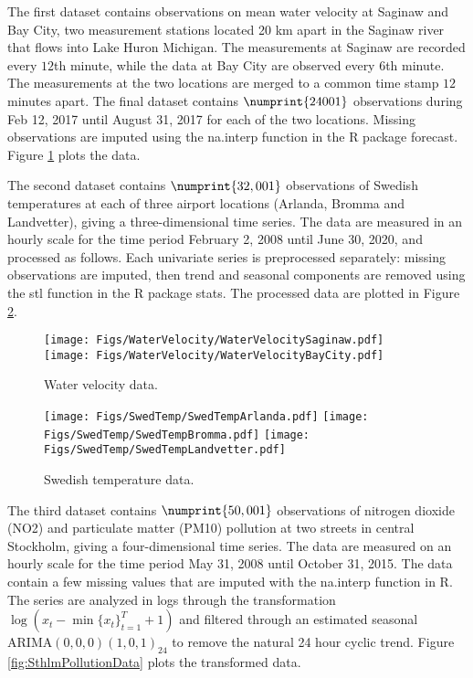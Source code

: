 \documentclass[11pt,english,oneside]{amsart}
\numberwithin{equation}{section}
\theoremstyle{plain}
\numberwithin{equation}{section}
\begin{document}
The first dataset contains observations on mean water velocity at Saginaw and Bay City, two measurement stations located 20 km apart in the Saginaw river that flows into Lake Huron Michigan. The measurements at Saginaw are recorded every $12$th minute, while the data at Bay City are observed every $6$th minute. The measurements at the two locations are merged to a common time stamp $12$ minutes apart. The final dataset contains $\numprint{24001}$ observations during Feb 12, 2017 until August 31, 2017 for each of the two locations. Missing observations are imputed using the {\sf na.interp} function in the R package {\sf forecast}. Figure \ref{fig:WaterVelocityData} plots the data.

The second dataset contains $\numprint{32,001}$ observations of Swedish temperatures at each of three airport locations (Arlanda, Bromma and Landvetter), giving a three-dimensional time series. The data are measured in an hourly scale for the time period February 2, 2008 until June 30, 2020, and processed as follows. Each univariate series is preprocessed separately: missing observations are imputed, then trend and seasonal components are removed using the {\sf stl} function in the R package {\sf stats}. The processed data are plotted in Figure \ref{fig:SwedTempData}.


\begin{figure}\label{fig:WaterVelocityData}
    \texttt{[image: Figs/WaterVelocity/WaterVelocitySaginaw.pdf]}
    \texttt{[image: Figs/WaterVelocity/WaterVelocityBayCity.pdf]}
    \caption{Water velocity data.}
\end{figure}

\begin{figure}
    \texttt{[image: Figs/SwedTemp/SwedTempArlanda.pdf]}
    \texttt{[image: Figs/SwedTemp/SwedTempBromma.pdf]}
    \texttt{[image: Figs/SwedTemp/SwedTempLandvetter.pdf]}
    \caption{Swedish temperature data.}\label{fig:SwedTempData}
\end{figure}


The third dataset contains $\numprint{50,001}$ observations of nitrogen dioxide (NO2) and particulate matter (PM10) pollution at two streets in central Stockholm, giving a four-dimensional time series. The data are measured on an hourly scale for the time period May 31, 2008 until October 31, 2015. The data contain a few missing values that are imputed with the {\sf na.interp} function in R. The series are analyzed in logs through the transformation $\log(x_t-\min \{x_t\}_{t=1}^T + 1 )$ and filtered through an estimated seasonal $\mathrm{ARIMA}(0,0,0)(1,0,1)_{24}$ to remove the natural 24 hour cyclic trend. Figure \ref{fig:SthlmPollutionData} plots the transformed data.
\end{document}
